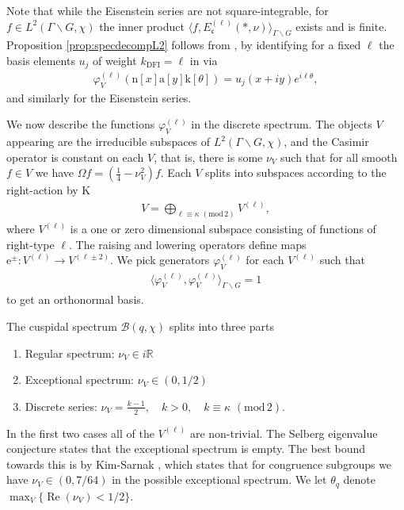 \documentclass[12pt]{amsart}
\theoremstyle{definition}
\theoremstyle{remark}
\numberwithin{equation}{section}
\newcommand{\R}{{\mathbb R}}
\newcommand{\1}{{\mathbf 1}}
\renewcommand{\Re}{\operatorname{Re}}
\renewcommand{\a}{\mathrm{a}}
\newcommand{\n}{\mathrm{n}}
\renewcommand{\k}{\mathrm{k}}
\renewcommand{\n}{\mathrm{n}}
\renewcommand{\pmod}[1]{\,\,(\mathrm{mod}\,{#1})}
\begin{document}
Note that while the Eisenstein series are not square-integrable, for $f \in L^{2}(\Gamma \backslash G,\chi)$ the inner product  $\langle f, E^{(\ell)}_{\mathfrak{c}}(*,\nu) \rangle_{\Gamma \backslash G} $ exists and is finite.
Proposition \ref{prop:specdecompL2} follows from \cite[Section 4]{DFIartin}, by identifying for a fixed $\ell$ the basis elements $u_j$ of weight $k_{\text{DFI}}=\ell$ in  \cite[(4.50))]{DFIartin} via
\begin{align*}
  \varphi_V^{(\ell)}(\n[x] \a[y] \k[\theta])=  u_j(x+iy) e^{i\ell \theta},
\end{align*}
and similarly for the Eisenstein series.  







We now describe the functions $\varphi_V^{(\ell)}$ in the discrete spectrum. The objects $V$ appearing are the irreducible subspaces of $L^2(\Gamma\backslash G,\chi)$, and the Casimir operator is constant on each $V$, that is, there is some $\nu_V$ such that for all smooth $f \in V$ we have $\Omega f = (\frac{1}{4}-\nu_V^2) f$. Each $V$ splits into subspaces according to the right-action by $\mathrm{K}$
\begin{align*}
    V = \bigoplus_{\ell \equiv \kappa \pmod{2}} V^{(\ell)},
\end{align*}
where $V^{(\ell)}$ is a one or zero dimensional subspace consisting of functions of right-type $\ell$. The raising and lowering operators define maps $\mathrm{e}^{\pm}: V^{(\ell)} \to  V^{(\ell \pm 2)}$. We pick generators $\varphi^{(\ell)}_V$ for each $V^{(\ell)}$ such that
\begin{align*}
    \langle \varphi^{(\ell)}_V, \varphi^{(\ell)}_V \rangle_{\Gamma \backslash G} =1
\end{align*}
to get an orthonormal basis.
 
The cuspidal spectrum $\mathcal{B}(q,\chi)$ splits into three parts
\begin{enumerate}
    \item Regular spectrum: $\nu_V \in i \R$
    \item Exceptional spectrum: $\nu_V \in (0,1/2)$
    \item Discrete series: $\nu_V =  \frac{k-1}{2}, \quad k > 0, \quad k \equiv \kappa \pmod{2}$.
    \end{enumerate}
In the first two cases all of the $V^{(\ell)}$ are non-trivial. The Selberg eigenvalue conjecture states that the exceptional spectrum is empty. The best bound towards this is by Kim-Sarnak \cite{KimSarnak}, which states that for congruence subgroups we have $\nu_V \in (0,7/64)$ in the possible exceptional spectrum. We let $\theta_q$ denote $\max_V\{  \Re(\nu_V) < 1/2\}$.
\end{document}

